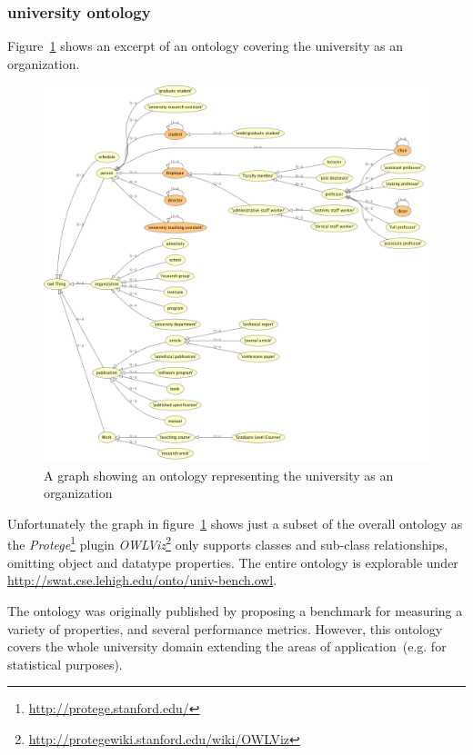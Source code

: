 \documentclass{article}
\begin{document}
\subsubsection{university ontology}
Figure~\ref{fig:owl-univ1} shows an excerpt of an ontology covering the university as an organization.
\begin{figure}[H]
	\centering \includegraphics*[width=.8\columnwidth]{owl-univ1.png}
	\caption{A graph showing an ontology representing the university as an organization}
	\label{fig:owl-univ1}
\end{figure}
Unfortunately the graph in figure~\ref{fig:owl-univ1} shows just a subset of the overall ontology as the \textit{Protege}\footnote{\url{http://protege.stanford.edu/}} plugin \textit{OWLViz}\footnote{\url{http://protegewiki.stanford.edu/wiki/OWLViz}} only supports classes and sub-class relationships, omitting object and datatype properties. The entire ontology is explorable under \url{http://swat.cse.lehigh.edu/onto/univ-bench.owl}. 

The ontology was originally published by \citet{article:university-ontology} proposing a benchmark for measuring a variety of properties, and several performance
metrics. However, this ontology covers the whole university domain extending the areas of application~(e.g. for statistical purposes). 
\end{document}
